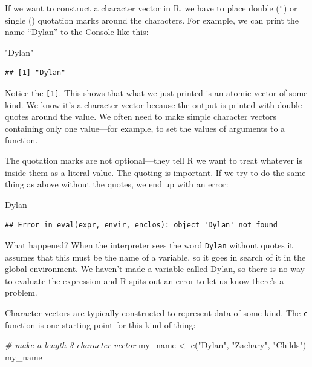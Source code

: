 \documentclass[
]{book}
\newenvironment{Shaded}{\begin{snugshade}}{\end{snugshade}}
\newcommand{\CommentTok}[1]{\textcolor[rgb]{0.56,0.35,0.01}{\textit{#1}}}
\newcommand{\FunctionTok}[1]{\textcolor[rgb]{0.00,0.00,0.00}{#1}}
\newcommand{\NormalTok}[1]{#1}
\newcommand{\OtherTok}[1]{\textcolor[rgb]{0.56,0.35,0.01}{#1}}
\newcommand{\StringTok}[1]{\textcolor[rgb]{0.31,0.60,0.02}{#1}}
\begin{document}
If we want to construct a character vector in R, we have to place double (\texttt{"}) or single (\texttt{\textquotesingle{}}) quotation marks around the characters. For example, we can print the name ``Dylan'' to the Console like this:

\begin{Shaded}
\begin{Highlighting}[]
\StringTok{"Dylan"}
\end{Highlighting}
\end{Shaded}

\begin{verbatim}
## [1] "Dylan"
\end{verbatim}

Notice the \texttt{{[}1{]}}. This shows that what we just printed is an atomic vector of some kind. We know it's a character vector because the output is printed with double quotes around the value. We often need to make simple character vectors containing only one value---for example, to set the values of arguments to a function.

The quotation marks are not optional---they tell R we want to treat whatever is inside them as a literal value. The quoting is important. If we try to do the same thing as above without the quotes, we end up with an error:

\begin{Shaded}
\begin{Highlighting}[]
\NormalTok{Dylan}
\end{Highlighting}
\end{Shaded}

\begin{verbatim}
## Error in eval(expr, envir, enclos): object 'Dylan' not found
\end{verbatim}

What happened? When the interpreter sees the word \texttt{Dylan} without quotes it assumes that this must be the name of a variable, so it goes in search of it in the global environment. We haven't made a variable called Dylan, so there is no way to evaluate the expression and R spits out an error to let us know there's a problem.

Character vectors are typically constructed to represent data of some kind. The \texttt{c} function is one starting point for this kind of thing:

\begin{Shaded}
\begin{Highlighting}[]
\CommentTok{\# make a length{-}3 character vector}
\NormalTok{my\_name }\OtherTok{\textless{}{-}} \FunctionTok{c}\NormalTok{(}\StringTok{"Dylan"}\NormalTok{, }\StringTok{"Zachary"}\NormalTok{, }\StringTok{"Childs"}\NormalTok{)}
\NormalTok{my\_name}
\end{Highlighting}
\end{Shaded}
\end{document}
